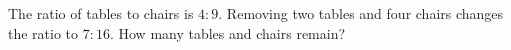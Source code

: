 The ratio of tables to chairs is $4:9$. Removing two tables and four chairs changes the ratio to $7:16$. How many tables and chairs remain?

